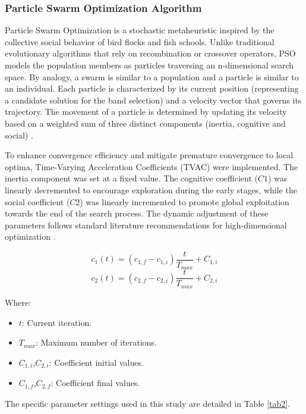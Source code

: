 \documentclass[runningheads]{llncs}
\begin{document}
\subsubsection{Particle Swarm Optimization Algorithm}
Particle Swarm Optimization is a stochastic metaheuristic inspired by the collective social behavior of bird flocks and fish schools. 
Unlike traditional evolutionary algorithms that rely on recombination or crossover operators, PSO models the population members as particles traversing an n-dimensional search space. By analogy, a swarm is similar to a population and a particle is similar to an individual.   
Each particle is characterized by its current position (representing a candidate solution for the band selection) and a velocity vector that governs its trajectory. 
The movement of a particle is determined by updating its velocity based on a weighted sum of three distinct components (inertia, cognitive and social) \cite{eiben_introduction_2015}.

To enhance convergence efficiency and mitigate premature convergence to local optima, Time-Varying Acceleration Coefficients (TVAC) were implemented. The inertia component was set at a fixed value.
The cognitive coefficient ($C1$) was linearly decremented to encourage exploration during the early stages, while the social coefficient ($C2$) was linearly incremented to promote global exploitation towards the end of the search process. 
The dynamic adjustment of these parameters follows standard literature recommendations for high-dimensional optimization \cite{ratnaweera_self-organizing_2004}. 

\begin{equation}
    c_1(t)=(c_{1,f}-c_{1,i}) \frac{t}{T_{max}}+C_{1,i}
\end{equation}
\begin{equation}
    c_2(t)=(c_{2,f}-c_{2,i}) \frac{t}{T_{max}}+C_{2,i}
\end{equation}

Where:
\begin{itemize}
    \item $t$: Current iteration.
    \item $T_{max}$: Maximum number of iterations.
    \item $C_{1,i}$,$C_{2,i}$: Coefficient initial values.
    \item $C_{1,f}$,$C_{2,f}$: Coefficient final values.
\end{itemize}
The specific parameter settings used in this study are detailed in Table \ref{tab2}.
\end{document}
